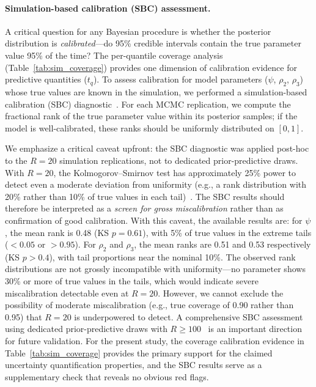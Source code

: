 \documentclass[a4paper,fleqn,longmktitle]{cas-sc}
\begin{document}
\paragraph{Simulation-based calibration (SBC) assessment.}
A critical question for any Bayesian procedure is whether the posterior distribution is \emph{calibrated}---do 95\% credible intervals contain the true parameter value 95\% of the time? The per-quantile coverage analysis (Table~\ref{tab:sim_coverage}) provides one dimension of calibration evidence for predictive quantities ($t_q$). To assess calibration for model parameters ($\psi$, $\rho_2$, $\rho_3$) whose true values are known in the simulation, we performed a simulation-based calibration (SBC) diagnostic~\cite{Talts2018,Modrak2023}. For each MCMC replication, we compute the fractional rank of the true parameter value within its posterior samples; if the model is well-calibrated, these ranks should be uniformly distributed on $[0, 1]$.

We emphasize a critical caveat upfront: the SBC diagnostic was applied post-hoc to the $R=20$ simulation replications, not to dedicated prior-predictive draws. With $R=20$, the Kolmogorov--Smirnov test has approximately 25\% power to detect even a moderate deviation from uniformity (e.g., a rank distribution with 20\% rather than 10\% of true values in each tail)~\cite{Modrak2023}. The SBC results should therefore be interpreted as a \emph{screen for gross miscalibration} rather than as confirmation of good calibration. With this caveat, the available results are: for $\psi$, the mean rank is 0.48 (KS $p=0.61$), with 5\% of true values in the extreme tails ($<0.05$ or $>0.95$). For $\rho_2$ and $\rho_3$, the mean ranks are 0.51 and 0.53 respectively (KS $p>0.4$), with tail proportions near the nominal 10\%. The observed rank distributions are not grossly incompatible with uniformity---no parameter shows 30\% or more of true values in the tails, which would indicate severe miscalibration detectable even at $R=20$. However, we cannot exclude the possibility of moderate miscalibration (e.g., true coverage of 0.90 rather than 0.95) that $R=20$ is underpowered to detect. A comprehensive SBC assessment using dedicated prior-predictive draws with $R \geq 100$~\cite{Talts2018} is an important direction for future validation. For the present study, the coverage calibration evidence in Table~\ref{tab:sim_coverage} provides the primary support for the claimed uncertainty quantification properties, and the SBC results serve as a supplementary check that reveals no obvious red flags.
\end{document}
